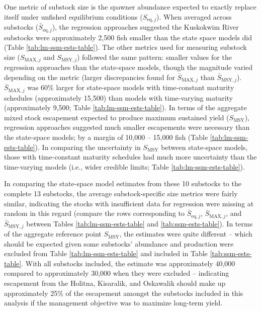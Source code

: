 \documentclass[12pt,]{book}
\theoremstyle{definition}
\theoremstyle{definition}
\theoremstyle{definition}
\theoremstyle{remark}
\begin{document}
One metric of substock size is the spawner abundance expected to exactly
replace itself under unfished equilibrium conditions
(\(S_{\text{eq},j}\)). When averaged across substocks
(\(\bar{S}_{\text{eq},j}\)), the regression approaches suggested the
Kuskokwim River substocks were approximately 2,500 fish smaller than the
state space models did (Table \ref{tab:lm-ssm-ests-table}). The other
metrics used for measuring substock size (\(S_{\text{MAX},j}\) and
\(S_{\text{MSY},j}\)) followed the same pattern: smaller values for the
regression approaches than the state-space models, though the magnitude
varied depending on the metric (larger discrepancies found for
\(\bar{S}_{\text{MAX},j}\) than \(\bar{S}_{\text{MSY},j}\)).
\(\bar{S}_{\text{MAX},j}\) was 60\% larger for state-space models with
time-constant maturity schedules (approximately 15,500) than models with
time-varying maturity (approximately 9,500; Table
\ref{tab:lm-ssm-ests-table}). In terms of the aggregate mixed stock
escapement expected to produce maximum sustained yield
(\(S_{\text{MSY}}\)), regression approaches suggested much smaller
escapements were necessary than the state-space models; by a margin of
10,000 -- 15,000 fish (Table \ref{tab:lm-ssm-ests-table}). In comparing
the uncertainty in \(S_{\text{MSY}}\) between state-space models, those
with time-constant maturity schedules had much more uncertainty than the
time-varying models (i.e., wider credible limits; Table
\ref{tab:lm-ssm-ests-table}).

In comparing the state-space model estimates from these 10 substocks to
the complete 13 substocks, the average substock-specific size metrics
were fairly similar, indicating the stocks with insufficient data for
regression were missing at random in this regard (compare the rows
corresponding to \(\bar{S}_{\text{eq},j}\), \(\bar{S}_{\text{MAX},j}\),
and \(\bar{S}_{\text{MSY},j}\) between Tables
\ref{tab:lm-ssm-ests-table} and \ref{tab:ssm-ests-table}). In terms of
the aggregate reference point \(S_{\text{MSY}}\), the estimates were
quite different -- which should be expected given some substocks'
abundance and production were excluded from Table
\ref{tab:lm-ssm-ests-table} and included in Table
\ref{tab:ssm-ests-table}. With all substocks included, the estimate was
approximately 40,000 compared to approximately 30,000 when they were
excluded -- indicating escapement from the Holitna, Kisaralik, and
Oskawalik should make up approximately 25\% of the escapement amongst
the substocks included in this analysis if the management objective was
to maximize long-term yield.
\end{document}
